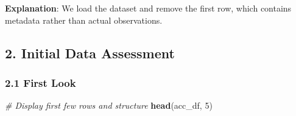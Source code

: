 \documentclass[
]{article}
\newenvironment{Shaded}{\begin{snugshade}}{\end{snugshade}}
\newcommand{\CommentTok}[1]{\textcolor[rgb]{0.56,0.35,0.01}{\textit{#1}}}
\newcommand{\DecValTok}[1]{\textcolor[rgb]{0.00,0.00,0.81}{#1}}
\newcommand{\FunctionTok}[1]{\textcolor[rgb]{0.13,0.29,0.53}{\textbf{#1}}}
\newcommand{\NormalTok}[1]{#1}
\begin{document}
\textbf{Explanation}: We load the dataset and remove the first row,
which contains metadata rather than actual observations.

\subsection{2. Initial Data Assessment}\label{initial-data-assessment}

\subsubsection{2.1 First Look}\label{first-look}

\begin{Shaded}
\begin{Highlighting}[]
\CommentTok{\# Display first few rows and structure}
\FunctionTok{head}\NormalTok{(acc\_df, }\DecValTok{5}\NormalTok{)}
\end{Highlighting}
\end{Shaded}
\end{document}
